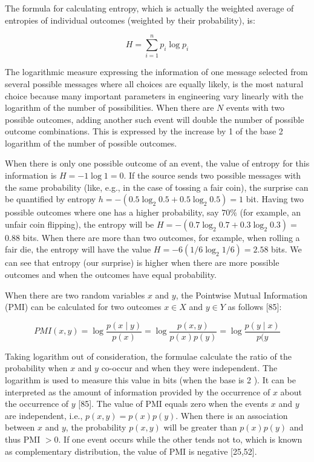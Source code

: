 \documentclass[10pt]{book}
\begin{document}
The formula for calculating entropy, which is actually the weighted average of entropies of individual outcomes (weighted by their probability), is:


\begin{equation*}
H=\sum_{i=1}^{n} p_{i} \log p_{i} \tag{14.6}
\end{equation*}


The logarithmic measure expressing the information of one message selected from several possible messages where all choices are equally likely, is the most natural choice because many important parameters in engineering vary linearly with the logarithm of the number of possibilities. When there are $N$ events with two possible outcomes, adding another such event will double the number of possible outcome combinations. This is expressed by the increase by 1 of the base 2 logarithm of the number of possible outcomes.

When there is only one possible outcome of an event, the value of entropy for this information is $H=-1 \log 1=0$. If the source sends two possible messages with the same probability (like, e.g., in the case of tossing a fair coin), the surprise can be quantified by entropy $h=-\left(0.5 \log _{2} 0.5+0.5 \log _{2} 0.5\right)=1$ bit. Having two possible outcomes where one has a higher probability, say $70 \%$ (for example, an unfair coin flipping), the entropy will be $H=-\left(0.7 \log _{2} 0.7+0.3 \log _{2} 0.3\right)=$ 0.88 bits. When there are more than two outcomes, for example, when rolling a fair die, the entropy will have the value $H=-6\left(1 / 6 \log _{2} 1 / 6\right)=2.58$ bits. We can see that entropy (our surprise) is higher when there are more possible outcomes and when the outcomes have equal probability.

When there are two random variables $x$ and $y$, the Pointwise Mutual Information (PMI) can be calculated for two outcomes $x \in X$ and $y \in Y$ as follows [85]:


\begin{equation*}
P M I(x, y)=\log \frac{p(x \mid y)}{p(x)}=\log \frac{p(x, y)}{p(x) p(y)}=\log \frac{p(y \mid x)}{p(y} \tag{14.7}
\end{equation*}


Taking logarithm out of consideration, the formulae calculate the ratio of the probability when $x$ and $y$ co-occur and when they were independent. The logarithm is used to measure this value in bits (when the base is 2 ). It can be\\
interpreted as the amount of information provided by the occurrence of $x$ about the occurrence of $y$ [85]. The value of PMI equals zero when the events $x$ and $y$ are independent, i.e., $p(x, y)=p(x) p(y)$. When there is an association between $x$ and $y$, the probability $p(x, y)$ will be greater than $p(x) p(y)$ and thus PMI $>0$. If one event occurs while the other tends not to, which is known as complementary distribution, the value of PMI is negative [25,52].
\end{document}
